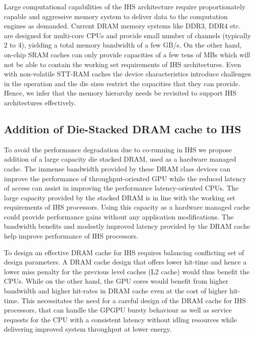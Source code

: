 \par Large computational capabilities of the IHS architecture require proportionately capable and aggressive memory system to deliver data to the computation engines as demanded. Current DRAM memory systems like DDR3, DDR4 etc. are designed for multi-core CPUs and provide small number of channels (typically 2 to 4), yielding a total memory bandwidth of a few GB/s. On the other hand, on-chip SRAM caches can only provide capacities of a few tens of MBs which will not be able to contain the working set requirements of IHS architectures. Even with non-volatile STT-RAM caches the device characteristics introduce challenges in the operation and the die sizes restrict the capacities that they can provide. Hence, we infer that the memory hierarchy needs be revisited to support IHS architectures effectively.


\subsection{Addition of Die-Stacked DRAM cache to IHS}
To avoid the performance degradation due to co-running in IHS we propose addition of a large capacity die stacked DRAM, used as a hardware managed cache. The immense bandwidth provided by these DRAM class devices can improve the performance of throughput-oriented GPU while the reduced latency of access can assist in improving the performance latency-oriented CPUs. The large capacity provided by the stacked DRAM is in line with the working set requirements of IHS processors. Using this capacity as a hardware managed cache could provide performance gains without any application modifications. The bandwidth benefits and modestly improved latency provided by the DRAM cache help improve performance of IHS processors. 
\par To design an effective DRAM cache for IHS requires balancing conflicting set of design parameters. A DRAM cache design that offers lower hit-time and hence a lower miss penalty for the previous level caches (L2 cache) would thus benefit the CPUs. While on the other hand, the GPU cores would benefit from higher bandwidth and higher hit-rates in DRAM cache even at the cost of higher hit-time. This necessitates the need for a careful design of the DRAM cache for IHS processors, that can handle the GPGPU bursty behaviour as well as service requests for the CPU with a consistent latency without idling resources while delivering improved system throughput at lower energy.

